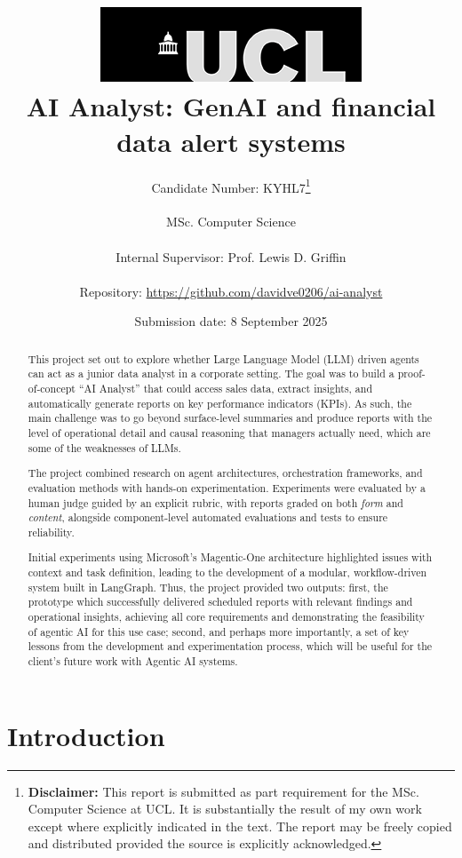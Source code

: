 \documentclass[a4paper]{report}
\title{{\vspace{-14em} \includegraphics[scale=0.4]{images/ucl_logo.png}}\\
{{\Huge AI Analyst: GenAI and financial data alert systems}}\\
}
\date{Submission date: 8 September 2025}
\author{Candidate Number: KYHL7\thanks{
{\bf Disclaimer:}
This report is submitted as part requirement for the MSc. Computer Science at UCL. It is substantially the result of my own work except where explicitly indicated in the text. The report may be freely copied and distributed provided the source is explicitly acknowledged.}
\\ \\
MSc. Computer Science\\ \\
Internal Supervisor: Prof. Lewis D. Griffin\\ \\
Repository: \url{https://github.com/davidve0206/ai-analyst}}
\begin{document}
 
\onehalfspacing

\maketitle


\tableofcontents

\setcounter{page}{1}
\begin{abstract}
This project set out to explore whether Large Language Model (LLM) driven agents can act as a junior data analyst in a corporate setting. The goal was to build a proof-of-concept “AI Analyst” that could access sales data, extract insights, and automatically generate reports on key performance indicators (KPIs). As such, the main challenge was to go beyond surface-level summaries and produce reports with the level of operational detail and causal reasoning that managers actually need, which are some of the weaknesses of LLMs.

The project combined research on agent architectures, orchestration frameworks, and evaluation methods with hands-on experimentation. Experiments were evaluated by a human judge guided by an explicit rubric, with reports graded on both \textit{form} and \textit{content}, alongside component-level automated evaluations and tests to ensure reliability.

Initial experiments using Microsoft’s Magentic-One architecture highlighted issues with context and task definition, leading to the development of a modular, workflow-driven system built in LangGraph. Thus, the project provided two outputs: first, the prototype which successfully delivered scheduled reports with relevant findings and operational insights, achieving all core requirements and demonstrating the feasibility of agentic AI for this use case; second, and perhaps more importantly, a set of key lessons from the development and experimentation process, which will be useful for the client's future work with Agentic AI systems.
\end{abstract}

\chapter{Introduction}
\label{chapter:introduction}
\end{document}
